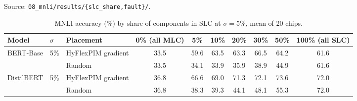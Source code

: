 \noindent Source: \nolinkurl{08_mnli/results/{slc_share,fault}/}.
\begin{table}[H]
\centering\footnotesize
\caption{MNLI accuracy (\%) by share of components in SLC at $\sigma=5\%$, mean of 20 chips.}
\begin{tabular}{@{}lllccccccc@{}}
\toprule
Model & $\sigma$ & Placement & 0\% (all MLC) & 5\% & 10\% & 20\% & 30\% & 50\% & 100\% (all SLC) \\
\midrule
\multirow{2}{*}{BERT-Base} & 5\% & HyFlexPIM gradient & 33.5 & 59.6 & 63.5 & 63.3 & 66.5 & 64.2 & 61.6 \\
 &  & Random & 33.5 & 34.1 & 33.9 & 35.9 & 38.9 & 44.9 & 61.6 \\
\midrule
\multirow{2}{*}{DistilBERT} & 5\% & HyFlexPIM gradient & 36.8 & 66.6 & 69.0 & 71.3 & 72.1 & 73.6 & 72.0 \\
 &  & Random & 36.8 & 38.3 & 39.3 & 44.1 & 48.1 & 55.3 & 72.0 \\
\bottomrule
\end{tabular}
\end{table}

\begin{table}[H]
\centering\footnotesize
\caption{MNLI accuracy (\%) against the share of stuck cells, 20\% SLC, mean of 20 chips.}
\end{table}
